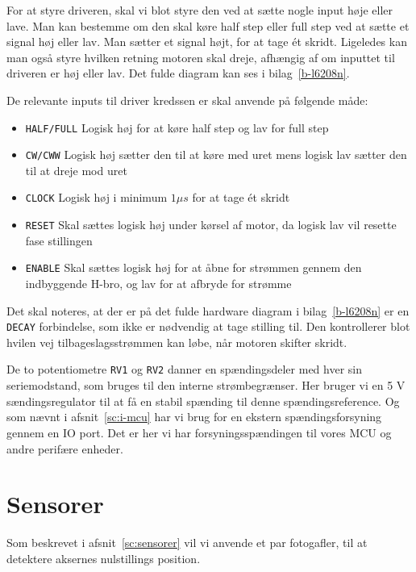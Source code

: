 For at styre driveren, skal vi blot styre den ved at sætte nogle input
høje eller lave. Man kan bestemme om den skal køre half step eller
full step ved at sætte et signal høj eller lav. Man sætter et signal
højt, for at tage ét skridt. Ligeledes kan man også styre hvilken
retning motoren skal dreje, afhængig af om inputtet til driveren er
høj eller lav. Det fulde diagram kan ses i bilag~\vref{b-l6208n}.

De relevante inputs til driver kredssen er skal anvende på følgende måde:

\begin{itemize} \firmlist
\item \texttt{HALF/FULL} Logisk høj for at køre half step
  og lav for full step
\item \texttt{CW/CWW} Logisk høj sætter den til at køre med uret mens
  logisk lav sætter den til at dreje mod uret
\item \texttt{CLOCK} Logisk høj i minimum $1 \mu s$ for at tage ét skridt
\item \texttt{RESET} Skal sættes logisk høj under kørsel af motor, da
  logisk lav vil resette fase stillingen
\item \texttt{ENABLE} Skal sættes logisk høj for at åbne for strømmen
  gennem den indbyggende H-bro, og lav for at afbryde for strømme
\end{itemize}

Det skal noteres, at der er på det fulde hardware diagram i
bilag~\vref{b-l6208n} er en \texttt{DECAY} forbindelse, som ikke er
nødvendig at tage stilling til. Den kontrollerer blot hvilen vej
tilbageslagsstrømmen kan løbe, når motoren skifter skridt.

De to potentiometre \texttt{RV1} og \texttt{RV2} danner en
spændingsdeler med hver sin seriemodstand, som bruges til den interne
strømbegrænser. Her bruger vi en 5 V sændingsregulator til at få en
stabil spænding til denne spændingsreference. Og som nævnt i
afsnit~\vref{sc:i-mcu} har vi brug for en ekstern spændingsforsyning
gennem en IO port. Det er her vi har forsyningsspændingen til vores
MCU og andre perifære enheder.

\section{Sensorer}
Som beskrevet i afsnit~\vref{sc:sensorer} vil vi anvende et par
fotogafler, til at detektere aksernes nulstillings position.


